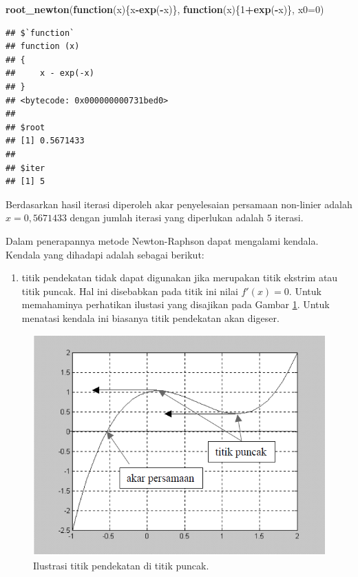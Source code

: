 \documentclass[]{book}
\newenvironment{Shaded}{\begin{snugshade}}{\end{snugshade}}
\newcommand{\ControlFlowTok}[1]{\textcolor[rgb]{0.13,0.29,0.53}{\textbf{#1}}}
\newcommand{\DataTypeTok}[1]{\textcolor[rgb]{0.13,0.29,0.53}{#1}}
\newcommand{\DecValTok}[1]{\textcolor[rgb]{0.00,0.00,0.81}{#1}}
\newcommand{\KeywordTok}[1]{\textcolor[rgb]{0.13,0.29,0.53}{\textbf{#1}}}
\newcommand{\NormalTok}[1]{#1}
\newcommand{\OperatorTok}[1]{\textcolor[rgb]{0.81,0.36,0.00}{\textbf{#1}}}
\providecommand{\tightlist}{%
  \setlength{\itemsep}{0pt}\setlength{\parskip}{0pt}}
\theoremstyle{definition}
\theoremstyle{definition}
\theoremstyle{definition}
\theoremstyle{remark}
\begin{document}
\begin{Shaded}
\begin{Highlighting}[]
\KeywordTok{root_newton}\NormalTok{(}\ControlFlowTok{function}\NormalTok{(x)\{x}\OperatorTok{-}\KeywordTok{exp}\NormalTok{(}\OperatorTok{-}\NormalTok{x)\},}
            \ControlFlowTok{function}\NormalTok{(x)\{}\DecValTok{1}\OperatorTok{+}\KeywordTok{exp}\NormalTok{(}\OperatorTok{-}\NormalTok{x)\},}
              \DataTypeTok{x0=}\DecValTok{0}\NormalTok{)}
\end{Highlighting}
\end{Shaded}

\begin{verbatim}
## $`function`
## function (x) 
## {
##     x - exp(-x)
## }
## <bytecode: 0x000000000731bed0>
## 
## $root
## [1] 0.5671433
## 
## $iter
## [1] 5
\end{verbatim}

Berdasarkan hasil iterasi diperoleh akar penyelesaian persamaan non-linier adalah \(x=0,5671433\) dengan jumlah iterasi yang diperlukan adalah \(5\) iterasi.

Dalam penerapannya metode Newton-Raphson dapat mengalami kendala. Kendala yang dihadapi adalah sebagai berikut:

\begin{enumerate}
\def\labelenumi{\arabic{enumi}.}
\tightlist
\item
  titik pendekatan tidak dapat digunakan jika merupakan titik ekstrim atau titik puncak. Hal ini disebabkan pada titik ini nilai \(f'\left(x \right)=0\). Untuk memahaminya perhatikan ilustasi yang disajikan pada Gambar \ref{fig:nrviz2}. Untuk menatasi kendala ini biasanya titik pendekatan akan digeser.
\end{enumerate}

\begin{figure}

{\centering \includegraphics[width=0.9\linewidth]{./images/nrviz2} 

}

\caption{Ilustrasi titik pendekatan di titik puncak.}\label{fig:nrviz2}
\end{figure}
\end{document}
